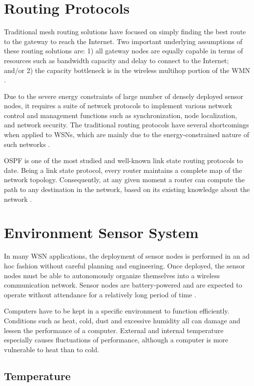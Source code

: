 
\section{Routing Protocols}
Traditional mesh routing solutions have focused on simply finding the best route to the gateway to reach the Internet. Two important underlying assumptions of these routing solutions are: 1) all gateway nodes are equally capable in terms of resources such as bandwidth capacity and delay to connect to the Internet; and/or 2) the capacity bottleneck is in the wireless multihop portion of the WMN \cite{Prashanth2015}.

Due to the severe energy constraints of large number of densely deployed sensor nodes, it requires a suite of network protocols to implement various network control and management functions such as synchronization, node localization, and network security. The traditional routing protocols have several shortcomings when applied to WSNs, which are mainly due to the energy-constrained nature of such networks \cite{Shio2010}.

OSPF is one of the most studied and well-known link state routing protocols to date. Being a link state protocol, every router maintains a complete map of the network topology. Consequently, at any given moment a router can compute the path to any destination in the network, based on its existing knowledge about the network \cite{Holter2010}.

\section{Environment Sensor System}
In many WSN applications, the deployment of sensor nodes is performed in an ad hoc fashion without careful planning and engineering. Once deployed, the sensor nodes must be able to autonomously organize themselves into a wireless communication network. Sensor nodes are battery-powered and are expected to operate without attendance for a relatively long period of time \cite{Shio2010}.

Computers have to be kept in a specific environment to function efficiently. Conditions such as heat, cold, dust and excessive humidity all can damage and lessen the performance of a computer. External and internal temperature especially causes fluctuations of performance, although a computer is more vulnerable to heat than to cold.

\subsection{Temperature}
